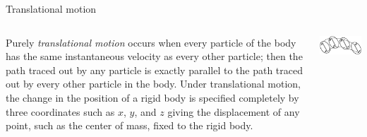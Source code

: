 \documentclass[18pt]{LectMechanics}
\begin{document}
\begin{frame}{Translational motion}{}
\begin{columns}
	\begin{column}{0.5\linewidth}
			Purely \emph{translational motion} occurs when every particle of the body has the same instantaneous velocity as every other particle; then the path traced out by any particle is exactly parallel to the path traced out by every other particle in the body. Under translational motion, the change in the position of a rigid body is specified completely by three coordinates such as $x$, $y$, and $z$ giving the displacement of any point, such as the center of mass, fixed to the rigid body.
	\end{column}
	\begin{column}{0.5\linewidth}
		\begin{center}
			\includegraphics[width=\linewidth]{Translation_motion}
		\end{center}
	\end{column}
\end{columns}
\end{frame}
\end{document}
